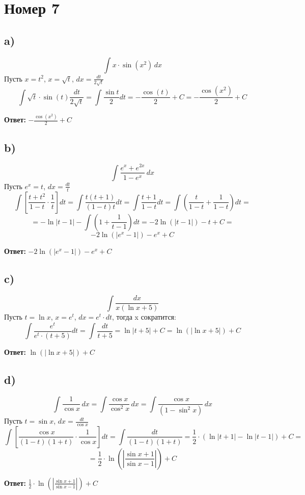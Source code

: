 \documentclass[a4paper,12pt]{article}
\begin{document}
\section*{Номер 7}
\subsection*{a)}
\[
\int x \cdot \sin (x^2) \,dx
\]
Пусть $x = t^2$, $x = \sqrt{t}$, $dx = \frac{dt}{2\sqrt{t}}$
\[
\int \sqrt{t} \cdot \sin (t) \frac{dt}{2\sqrt{t}} =  \int \frac{\sin t}{2} dt = -\frac{\cos(t)}{2} + C = -\frac{\cos(x^2)}{2} + C\]
{\Large \begin{center}
\textbf{Ответ: } $ -\frac{\cos(x^2)}{2} + C$
\end{center}}
\subsection*{b)}
\[
\int \frac{e^x + e^{2x}}{1-e^x} \,dx
\]
Пусть $e^x = t$, $dx = \frac{dt}{t}$
\[
\int\left[ \frac{t + t^2}{1 - t} \cdot \frac{1}{t}  \right]dt= \int \frac{t(t+1)}{(1-t)t} dt = \int \frac{t+1}{1-t}dt = \int (\frac{t}{1-t} + \frac{1}{1-t}) dt  =
\]
\[
= - \ln |t - 1| - \int \left(1 + \frac{1}{t-1}\right) dt = -2 \ln \left( |t - 1| \right) - t+ C = 
\]
\[
-2 \ln \left( |e^x - 1| \right) - e^x + C
\]
{\Large \begin{center}
\textbf{Ответ: } $-2 \ln \left( |e^x - 1| \right) - e^x + C$
\end{center}}
\subsection*{c)}
\[
\int \frac{dx}{x(\ln x + 5)}
\]
Пусть $t = \ln x$, $x = e^t$, $dx = e^t\cdot dt$, тогда x сократится:
\[
\int \frac{e^t}{e^t\cdot (t+5)} dt= \int \frac{dt}{t+5} = \ln |t+5|+ C = \ln \left(|\ln x + 5|\right) + C
\]
{\Large \begin{center}
\textbf{Ответ: } $\ln \left(|\ln x + 5|\right) + C$
\end{center}}
\subsection*{d)}
\[
\int \frac{1}{\cos x} \,dx = \int  \frac{\cos x}{\cos^2 x} \,dx = \int \frac{\cos x}{(1 - \sin^2 x)} \,dx
\]
Пусть $t = \sin x$, $dx = \frac{dt}{\cos x}$
\[
\int \left[\frac{\cos x}{(1-t)(1+t)} \cdot \frac{1}{\cos x} \right]dt=  \int \frac{dt}{(1-t)(1+t)} = \frac{1}{2} \cdot \left(\ln |t + 1| - \ln |t-1|\right) + C =
\]
\[
= \frac{1}{2} \cdot \ln \left(
\left |\frac{\sin x + 1}{\sin x - 1}\right|\right ) + C
\]
{\Large \begin{center}
\textbf{Ответ: } $\frac{1}{2} \cdot \ln \left(
\left |\frac{\sin x + 1}{\sin x - 1}\right|\right ) + C
$
\end{center}}
\end{document}
